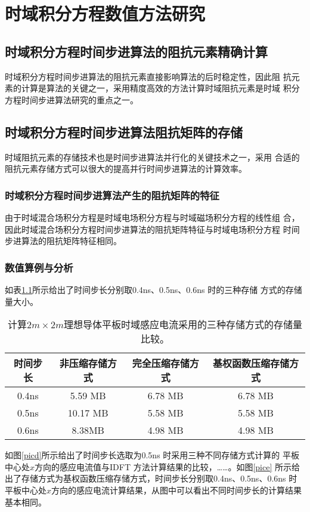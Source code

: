 \chapter{时域积分方程数值方法研究}
\section{时域积分方程时间步进算法的阻抗元素精确计算}
时域积分方程时间步进算法的阻抗元素直接影响算法的后时稳定性，因此阻
抗元素的计算是算法的关键之一，采用精度高效的方法计算时域阻抗元素是时域
积分方程时间步进算法研究的重点之一。

\section{时域积分方程时间步进算法阻抗矩阵的存储}
时域阻抗元素的存储技术也是时间步进算法并行化的关键技术之一，采用
合适的阻抗元素存储方式可以很大的提高并行时间步进算法的计算效率。

\subsection{时域积分方程时间步进算法产生的阻抗矩阵的特征}

由于时域混合场积分方程是时域电场积分方程与时域磁场积分方程的线性组
合，因此时域混合场积分方程时间步进算法的阻抗矩阵特征与时域电场积分方程
时间步进算法的阻抗矩阵特征相同。
\subsection{数值算例与分析}
如表\ref{tablea}所示给出了时间步长分别取0.4ns、0.5ns、0.6ns 时的三种存储
方式的存储量大小。

\begin{table}[h]
	\caption{计算$2m\times 2m$理想导体平板时域感应电流采用的三种存储方式的存储量比较。} 
	\begin{tabular}{|c|c|c|c|} 
		\hline  
		时间步长 & 非压缩存储方式 & 完全压缩存储方式 & 基权函数压缩存储方式 \\
		\hline 
		0.4ns & 5.59 MB & 6.78 MB & 6.78 MB\\  
		\hline  
		0.5ns & 10.17 MB & 5.58 MB & 5.58 MB \\  
		\hline  
		0.6ns & 8.38MB & 4.98 MB & 4.98 MB \\  
		\hline  
	\end{tabular}
	\label{tablea}
\end{table}

如图\ref{picd}所示给出了时间步长选取为0.5ns 时采用三种不同存储方式计算的
平板中心处$x$方向的感应电流值与IDFT 方法计算结果的比较，……。如图\ref{pice}
所示给出了存储方式为基权函数压缩存储方式，时间步长分别取0.4ns、0.5ns、0.6ns
时平板中心处$x$方向的感应电流计算结果，从图中可以看出不同时间步长的计算结果基本相同。

